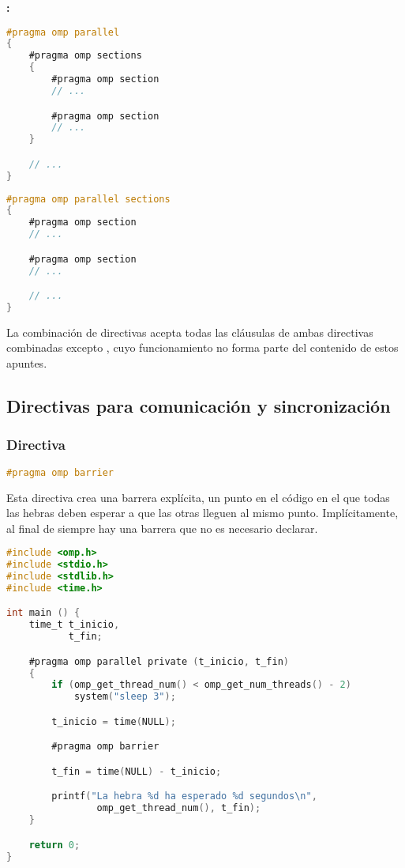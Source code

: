 \textbf{:}

\begin{lstlisting}[language=C]
#pragma omp parallel
{
	#pragma omp sections
	{
		#pragma omp section
		// ...

		#pragma omp section
		// ...
	}

	// ...
}
\end{lstlisting}

\begin{lstlisting}[language=C]
#pragma omp parallel sections
{
	#pragma omp section
	// ...

	#pragma omp section
	// ...

	// ...
}
\end{lstlisting}

La combinación de directivas acepta todas las cláusulas de ambas directivas combinadas excepto , cuyo funcionamiento no forma parte del contenido de estos apuntes.

\subsection{Directivas para comunicación y sincronización}\label{directivas-openmp-directivas}

\subsubsection{Directiva }

\begin{lstlisting}[language=C]
#pragma omp barrier
\end{lstlisting}

Esta directiva crea una barrera explícita, un punto en el código en el que todas las hebras deben esperar a que las otras lleguen al mismo punto.
Implícitamente, al final de  siempre hay una barrera que no es necesario declarar.

\begin{lstlisting}[language=C]
#include <omp.h>
#include <stdio.h>
#include <stdlib.h>
#include <time.h>

int main () {
	time_t t_inicio,
	       t_fin;

	#pragma omp parallel private (t_inicio, t_fin)
	{
		if (omp_get_thread_num() < omp_get_num_threads() - 2)
			system("sleep 3");

		t_inicio = time(NULL);

		#pragma omp barrier

		t_fin = time(NULL) - t_inicio;

		printf("La hebra %d ha esperado %d segundos\n",
		        omp_get_thread_num(), t_fin);
	}

	return 0;
}
\end{lstlisting}

